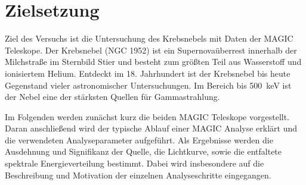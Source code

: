 \section{Zielsetzung}
\label{sec:zielsetzung}

Ziel des Versuchs ist die Untersuchung des Krebsnebels mit Daten der MAGIC
Teleskope. Der Krebsnebel (NGC 1952) ist ein Supernovaüberrest innerhalb der
Milchstraße im Sternbild Stier und besteht zum größten Teil aus Wasserstoff und
ionisiertem Helium. Entdeckt im 18. Jahrhundert ist der Krebsnebel bis heute
Gegenstand vieler astronomischer Untersuchungen. Im Bereich bis
\SI{500}{\kilo\electronvolt} ist der Nebel eine der stärksten Quellen für
Gammastrahlung.

Im Folgenden werden zunächst kurz die beiden MAGIC Teleskope vorgestellt. Daran
anschließend wird der typische Ablauf einer MAGIC Analyse erklärt und die
verwendeten Analyseparameter aufgeführt. Als Ergebnisse werden die Ausdehnung
und Signifikanz der Quelle, die Lichtkurve, sowie die entfaltete spektrale
Energieverteilung bestimmt. Dabei wird insbesondere auf die Beschreibung und
Motivation der einzelnen Analyseschritte eingegangen.
